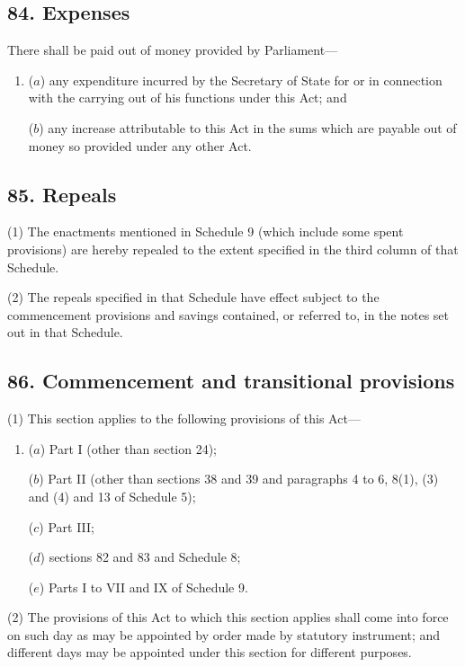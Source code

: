 \documentclass[12pt,a4paper]{article}
\begin{document}
\subsection{84. Expenses}

There shall be paid out of money provided by Parliament—
\begin{enumerate}\item[]
($a$) any expenditure incurred by the Secretary of State for or in connection with the carrying out of his functions under this Act; and

($b$) any increase attributable to this Act in the sums which are payable out of money so provided under any other Act.
\end{enumerate}

\subsection{85. Repeals}

(1) The enactments mentioned in Schedule 9 (which include some spent provisions) are hereby repealed to the extent specified in the third column of that Schedule.

(2) The repeals specified in that Schedule have effect subject to the commencement provisions and savings contained, or referred to, in the notes set out in that Schedule.

\subsection{86. Commencement and transitional provisions}

(1) This section applies to the following provisions of this Act—
\begin{enumerate}\item[]
($a$) Part I (other than section 24);

($b$) Part II (other than sections 38 and 39 and paragraphs 4 to 6, 8(1), (3)  and (4)  and 13 of Schedule 5);

($c$) Part III;

($d$) sections 82 and 83 and Schedule 8;

($e$) Parts I to VII and IX of Schedule 9. 
\end{enumerate}

(2) The provisions of this Act to which this section applies shall come into force on such day as may be appointed by order made by statutory instrument; and different days may be appointed under this section for different purposes.
\end{document}
